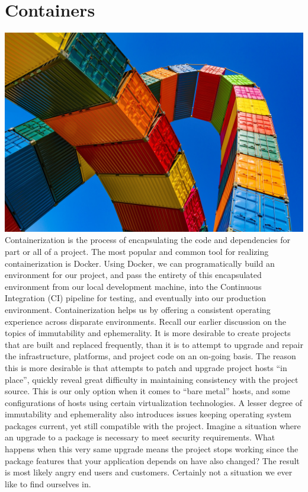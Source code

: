 \chapter{Containers}
\includegraphics[scale=0.85]{../images/container-4203677_1920.jpg}
\justify{}
Containerization is the process of encapsulating the code and dependencies for part
or all of a project. The most popular and common tool for realizing containerization is
Docker. Using Docker, we can programatically build an environment for our
project, and pass the entirety of this encapsulated environment from our local
development machine, into the Continuous Integration (CI)
pipeline for testing, and eventually into our production environment. 
Containerization helps us by offering a consistent operating
experience across disparate environments.
\justify
Recall our earlier discussion on the topics of immutability
and ephemerality. 
It is more desirable to create projects that are built
and replaced frequently, than it is to attempt to upgrade
and repair the infrastructure, platforms, and project code
on an on-going basis. The reason this is more desirable 
is that attempts to patch and upgrade project
hosts ``in place'', quickly reveal great difficulty in maintaining consistency
with the project source. This is our only option when it comes 
to ``bare metal'' hosts, and some configurations of hosts using
certain virtualization technologies. A lesser degree of immutability
and ephemerality also introduces issues keeping
operating system packages current, yet still compatible with
the project. Imagine a situation where an upgrade to a package
is necessary to meet security requirements. What happens when this very same
upgrade means the project stops working since the package
features that your application depends on have also changed?
The result is most likely angry end users and customers. Certainly not a situation
we ever like to find ourselves in.

